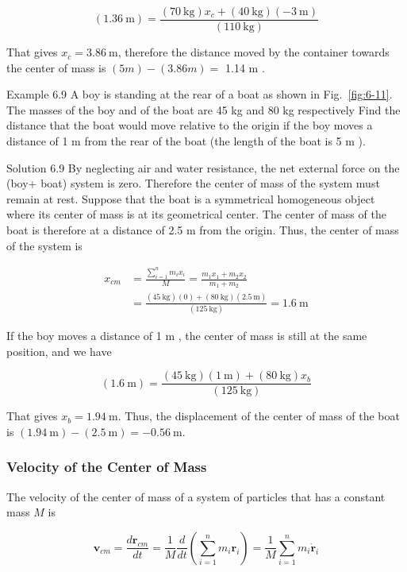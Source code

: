 \documentclass[10pt]{article}
\numberwithin{equation}{section}
\begin{document}
$$
(1.36 \mathrm{~m})=\frac{(70 \mathrm{~kg}) x_{c}+(40 \mathrm{~kg})(-3 \mathrm{~m})}{(110 \mathrm{~kg})}
$$

That gives $x_{c}=3.86 \mathrm{~m}$, therefore the distance moved by the container towards the center of mass is $(5 m)-(3.86 m)=$ 1.14 m .

Example 6.9 A boy is standing at the rear of a boat as shown in Fig.~\ref{fig:6-11}. The masses of the boy and of the boat are 45 kg and 80 kg respectively Find the distance that the boat would move relative to the origin if the boy moves a distance of 1 m from the rear of the boat (the length of the boat is 5 m ).

Solution 6.9 By neglecting air and water resistance, the net external force on the (boy+ boat) system is zero. Therefore the center of mass of the system must remain at rest. Suppose that the boat is a symmetrical homogeneous object where its center of mass is at its geometrical center. The center of mass of the boat is therefore at a distance of 2.5 m from the origin. Thus, the center of mass of the system is

$$
\begin{aligned}
x_{c m} & =\frac{\sum_{i=1}^{n} m_{i} x_{i}}{M}=\frac{m_{1} x_{1}+m_{2} x_{2}}{m_{1}+m_{2}} \\
& =\frac{(45 \mathrm{~kg})(0)+(80 \mathrm{~kg})(2.5 \mathrm{~m})}{(125 \mathrm{~kg})}=1.6 \mathrm{~m}
\end{aligned}
$$

If the boy moves a distance of 1 m , the center of mass is still at the same position, and we have

$$
(1.6 \mathrm{~m})=\frac{(45 \mathrm{~kg})(1 \mathrm{~m})+(80 \mathrm{~kg}) x_{b}}{(125 \mathrm{~kg})}
$$

That gives $x_{b}=1.94 \mathrm{~m}$. Thus, the displacement of the center of mass of the boat is $(1.94 \mathrm{~m})-(2.5 \mathrm{~m})=-0.56 \mathrm{~m}$.

\subsubsection{Velocity of the Center of Mass}\label{sec:6-3-5}
The velocity of the center of mass of a system of particles that has a constant mass $M$ is

$$
\mathbf{v}_{c m}=\frac{d \mathbf{r}_{c m}}{d t}=\frac{1}{M} \frac{d}{d t}\left(\sum_{i=1}^{n} m_{i} \mathbf{r}_{i}\right)=\frac{1}{M} \sum_{i=1}^{n} m_{i} \dot{\mathbf{r}}_{i}
$$
\end{document}
